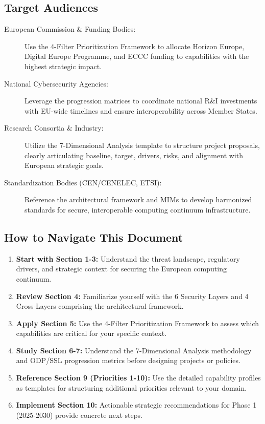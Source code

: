 \documentclass[12pt,a4paper]{report}
\begin{document}
\subsection*{Target Audiences}
\begin{description}
    \item[European Commission \& Funding Bodies:] Use the 4-Filter Prioritization Framework to allocate Horizon Europe, Digital Europe Programme, and ECCC funding to capabilities with the highest strategic impact.
    
    \item[National Cybersecurity Agencies:] Leverage the progression matrices to coordinate national R\&I investments with EU-wide timelines and ensure interoperability across Member States.
    
    \item[Research Consortia \& Industry:] Utilize the 7-Dimensional Analysis template to structure project proposals, clearly articulating baseline, target, drivers, risks, and alignment with European strategic goals.
    
    \item[Standardization Bodies (CEN/CENELEC, ETSI):] Reference the architectural framework and MIMs to develop harmonized standards for secure, interoperable computing continuum infrastructure.
\end{description}

\subsection*{How to Navigate This Document}
\begin{enumerate}
    \item \textbf{Start with Section 1-3:} Understand the threat landscape, regulatory drivers, and strategic context for securing the European computing continuum.
    \item \textbf{Review Section 4:} Familiarize yourself with the 6 Security Layers and 4 Cross-Layers comprising the architectural framework.
    \item \textbf{Apply Section 5:} Use the 4-Filter Prioritization Framework to assess which capabilities are critical for your specific context.
    \item \textbf{Study Section 6-7:} Understand the 7-Dimensional Analysis methodology and ODP/SSL progression metrics before designing projects or policies.
    \item \textbf{Reference Section 9 (Priorities 1-10):} Use the detailed capability profiles as templates for structuring additional priorities relevant to your domain.
    \item \textbf{Implement Section 10:} Actionable strategic recommendations for Phase 1 (2025-2030) provide concrete next steps.
\end{enumerate}
\end{document}
